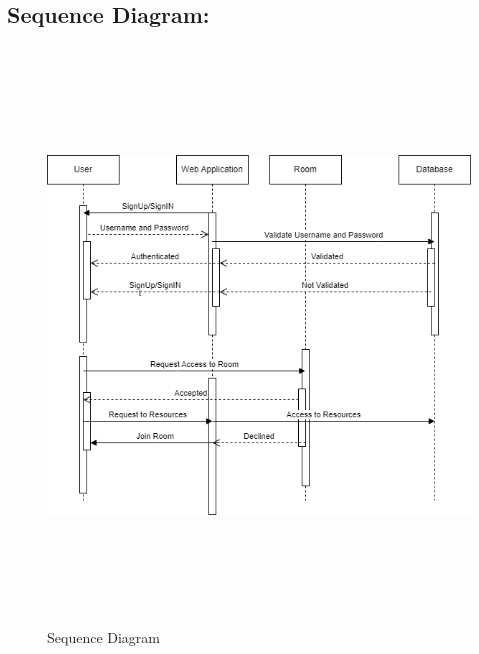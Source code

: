 \subsection{Sequence Diagram:}
\begin{figure}[h]
    \centering
    \includegraphics[width=6in, height=6in]{Proposal/static/Sequence_diagram_SAP.drawio.png}
    \caption{Sequence Diagram}
    \label{fig:enter-label}
\end{figure}
\newpage


